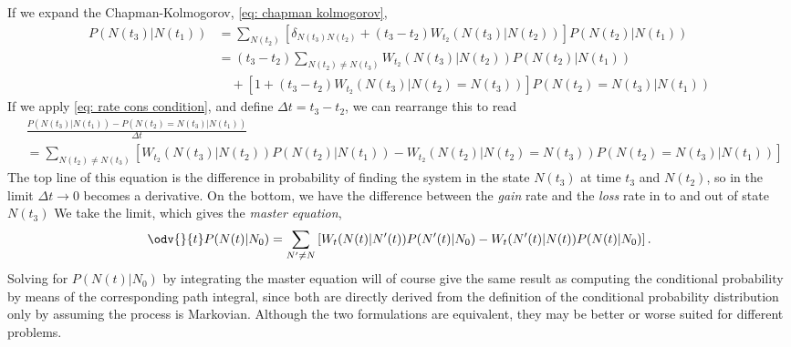 %
If we expand the Chapman-Kolmogorov, \autoref{eq: chapman kolmogorov},
%
\begin{align}
    P(N(t_3) |N(t_1))
    & =
    \sum_{N(t_2)} 
    \left[
        \delta_{N(t_3)N(t_2)}
        + (t_3 - t_2) W_{t_2}(N(t_3)|N(t_2))
    \right]
    P(N(t_2)|N(t_1))
    \\
    & =
    (t_3 - t_2)\sum_{N(t_2)\neq N(t_3)} 
        W_{t_2}(N(t_3)|N(t_2)) P(N(t_2)|N(t_1))\\
    & \quad 
    + \left[ 1 + (t_3 - t_2) W_{t_2}(N(t_3)|N(t_2)=N(t_3))  \right] P(N(t_2)=N(t_3)|N(t_1))
\end{align}
%
If we apply \autoref{eq: rate cons condition}, and define $\Delta t = t_3 - t_2$, we can rearrange this to read
%
\begin{align}
    &\frac{P\left(N(t_3)|N(t_1)\right) - P(N(t_2)=N(t_3)|N(t_1))}{\Delta t}\\
    &=
    \sum_{N(t_2) \neq N(t_3)}
    \left[
        W_{t_2}(N(t_3)|N(t_2))P(N(t_2)|N(t_1))
        - W_{t_2}(N(t_2)|N(t_2)=N(t_3))P(N(t_2)=N(t_3)|N(t_1))
    \right]
\end{align}
%
The top line of this equation is the difference in probability of finding the system in the state $N(t_3)$ at time $t_3$ and $N(t_2)$, so in the limit $\Delta t \rightarrow 0$ becomes a derivative.
On the bottom, we have the difference between the \emph{gain} rate and the \emph{loss} rate in to and out of state $N(t_3)$
We take the limit, which gives the \emph{master equation},
%
\begin{align}
    \odv{}{t} P(N(t)|N_0) =
    \sum_{N'\neq N} \left[
        W_t(N(t)|N'(t))P(N'(t)|N_0)
        - 
        W_t(N'(t)|N(t))P(N(t)|N_0)
    \right].
\end{align}
%
Solving for $P(N(t)|N_0)$ by integrating the master equation will of course give the same result as computing the conditional probability by means of the corresponding path integral, since both are directly derived from the definition of the conditional probability distribution only by assuming the process is Markovian.
Although the two formulations are equivalent, they may be better or worse suited for different problems.

